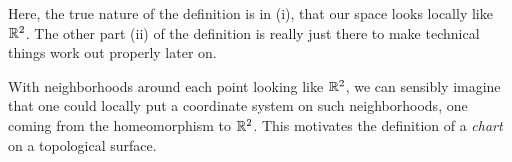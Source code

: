 \documentclass[a4paper]{article}
\begin{document}
Here, the true nature of the definition is in (i), that our space looks locally like $\R^2$. The other part (ii) of the definition is really just there to make technical things work out properly later on. 

With neighborhoods around each point looking like $\R^2$, we can sensibly imagine that one could locally put a coordinate system on such neighborhoods, one coming from the homeomorphism to $\R^2$. This motivates the definition of a \emph{chart} on a topological surface.

\begin{center}
    


\begin{tikzpicture}[x=0.75pt,y=0.75pt,yscale=-1,xscale=1]


\end{tikzpicture}
\end{center}
\end{document}
